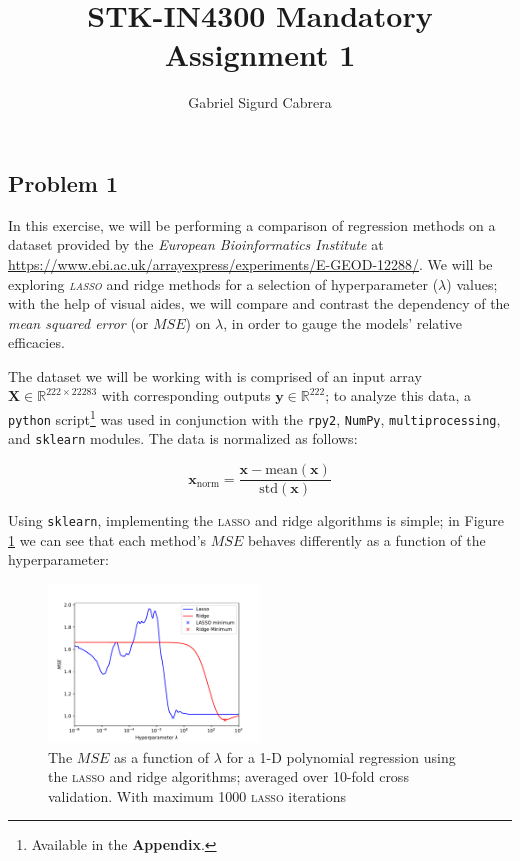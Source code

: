 \documentclass[a4paper,10pt,english]{article}
\begin{document}
\newcommand\esymbol[1]{\begin{circuitikz}
\draw (0,0) to [#1] (1,0); \end{circuitikz}}

\title{STK-IN4300 Mandatory Assignment 1}
\author{Gabriel Sigurd Cabrera}

\maketitle

\begin{multicols*}{2}

\section*{Problem 1}

In this exercise, we will be performing a comparison of regression methods on a dataset provided by the \textit{European Bioinformatics Institute} at \url{https://www.ebi.ac.uk/arrayexpress/experiments/E-GEOD-12288/}.  We will be exploring \textit{\textsc{lasso}} and ridge methods for a selection of hyperparameter ($\lambda$) values; with the help of visual aides, we will compare and contrast the dependency of the \textit{mean squared error} (or $MSE$) on $\lambda$, in order to gauge the models' relative efficacies.

The dataset we will be working with is comprised of an input array $\mathbf{X} \in \mathbb{R}^{222 \times 22283}$ with corresponding outputs $\mathbf{y} \in \mathbb{R}^{222}$; to analyze this data, a \texttt{python} script\footnote{Available in the \textbf{Appendix}.} was used in conjunction with the \texttt{rpy2}, \texttt{NumPy}, \texttt{multiprocessing}, and \texttt{sklearn} modules.  The data is normalized as follows:

\begin{equation*}
\mathbf{x}_\text{norm} = \frac{\mathbf{x} - \text{mean}(\mathbf{x})}{\text{std}(\mathbf{x})}
\end{equation*}

Using \texttt{sklearn}, implementing the \textsc{lasso} and ridge algorithms is simple; in Figure \ref{fig_1} we can see that each method's $MSE$ behaves differently as a function of the hyperparameter:

\begin{figure}[H]
	\centering  
	\includegraphics[width = 0.5\textwidth, center]{../a_1000_iter.pdf}
	\caption{The $MSE$ as a function of $\lambda$ for a 1-D polynomial regression using the \textsc{lasso} and ridge algorithms; averaged over 10-fold cross validation. With maximum 1000 \textsc{lasso} iterations}
	\label{fig_1}
\end{figure}


\end{multicols*}
\end{document}
